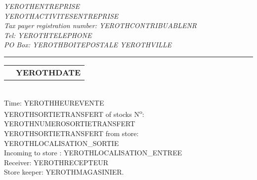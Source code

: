 \documentclass[2pt]{article} %
\makeatletter
\newcommand{\headerrow}[2]
{\begin{tabular*}{\linewidth}{l@{\extracolsep{\fill}}r}
	#1 &
	#2 \\
\end{tabular*}}
\makeatother
\begin{document}
\emph{YEROTHENTREPRISE} \\
\emph{YEROTHACTIVITESENTREPRISE} \\
\emph{Tax payer registration number: YEROTHCONTRIBUABLENR} \\
\emph{Tel: YEROTHTELEPHONE} \\
\emph{PO Box: YEROTHBOITEPOSTALE YEROTHVILLE}

\vspace*{0.2cm}

\hrule

\headerrow
{}
{\textbf{YEROTHDATE}}\\

Time: YEROTHHEUREVENTE\\
YEROTHSORTIETRANSFERT of stocks N\textsuperscript{o}: YEROTHNUMEROSORTIETRANSFERT\\
YEROTHSORTIETRANSFERT from store: YEROTHLOCALISATION_SORTIE\\
Incoming to store : YEROTHLOCALISATION_ENTREE\\
Receiver: YEROTHRECEPTEUR\\
Store keeper: YEROTHMAGASINIER.

\vspace*{0.2cm}

\end{document}
